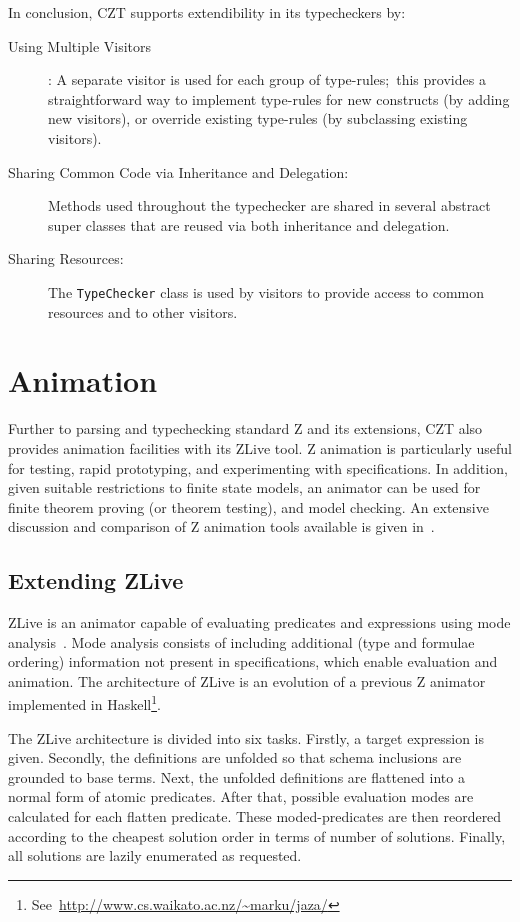\documentclass{llncs}
\begin{document}
In conclusion, CZT supports extendibility in its typecheckers by:
\begin{description}
 \item[Using Multiple Visitors]: A separate visitor is used for each
  group of type-rules;~this provides a straightforward way to implement
  type-rules for new constructs (by adding new visitors), or override
  existing type-rules (by subclassing existing visitors).
 \item[Sharing Common Code via Inheritance and Delegation:]
   Methods used throughout the typechecker
   are shared in several abstract super classes that are reused
   via both inheritance and delegation.
 \item[Sharing Resources:] The {\tt TypeChecker} class is used by
   visitors to provide access to common resources and to other visitors.
\end{description}

\section{Animation}\label{animation}

    Further to parsing and typechecking standard Z and its extensions,
    CZT also provides animation facilities with its ZLive tool.  Z
    animation is particularly useful for testing, rapid prototyping,
    and experimenting with specifications.  In addition, given
    suitable restrictions to finite state models, an animator can be
    used for finite theorem proving (or theorem testing), and model
    checking.  An extensive discussion and comparison of Z animation
    tools available is given in~\cite{utting-jaza}.

\subsection{Extending ZLive}

    ZLive is an animator capable of evaluating predicates and
    expressions using mode analysis~\cite{winikooff98}.
    Mode analysis consists of including additional (type and formulae
    ordering) information not present in specifications, which enable
    evaluation and animation.
    The architecture of ZLive is an evolution of a previous Z animator
    implemented in
    Haskell\footnote{See~\url{http://www.cs.waikato.ac.nz/~marku/jaza/}}.

    The ZLive architecture is divided into six tasks.  Firstly, a
    target expression is given. Secondly, the definitions are unfolded
    so that schema inclusions are grounded to base terms. Next, the
    unfolded definitions are flattened into a normal form of atomic predicates.
    After that, possible evaluation modes are calculated for each flatten
    predicate.  These moded-predicates are then reordered according to the
    cheapest solution order in terms of number of solutions.  Finally,
    all solutions are lazily enumerated as requested.
\end{document}
